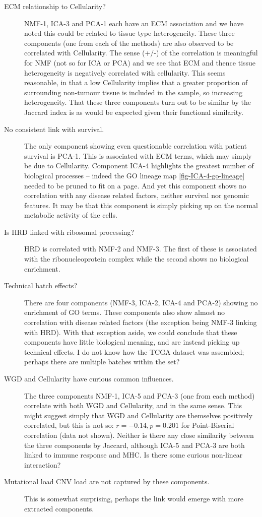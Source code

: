 \documentclass[tikz, 11pt,a4paper,oneside,fleqn, draft]{article}
\begin{document}
\begin{description}
\item[ECM relationship to Cellularity?]
NMF-1, ICA-3 and PCA-1 each have an ECM association and we have noted this could be related to tissue type heterogeneity.   These three components (one from each of the methods) are also observed to be correlated with Cellularity.  The sense (+/-) of the correlation is meaningful for NMF (not so for ICA or PCA) and we see that ECM and thence tissue heterogeneity is negatively correlated with cellularity. This seems reasonable, in that a low Cellularity implies that a greater proportion of surrounding non-tumour tissue is included in the sample, so increasing heterogeneity.   That these three components turn out to be similar by the Jaccard index is as would be expected given their functional similarity.
\item[No consistent link with survival.]
The only component showing even questionable correlation with patient survival is  PCA-1.  This is associated with ECM terms, which may simply be due to Cellularity.  
Component ICA-4 highlights the greatest number of biological processes -- indeed the GO lineage map \ref{fig-ICA-4-go-lineage} needed to be pruned to fit on a page.  And yet this component shows no correlation with any disease related factors, neither survival nor genomic features.  It may be that this component is simply picking up on the normal metabolic activity of the cells.
\item[Is HRD linked with ribosomal processing?]  HRD is correlated with NMF-2 and NMF-3.  The first of these is associated with the ribonucleoprotein complex while the second shows no biological enrichment.
\item[Technical batch effects?]
There are four components (NMF-3, ICA-2, ICA-4 and PCA-2) showing no enrichment of GO terms.  These components also show almost no correlation with disease related factors (the exception being NMF-3 linking with HRD).  With that exception aside, we could conclude that these components have little biological meaning, and are instead picking up technical effects.  I do not know how the TCGA dataset was assembled; perhaps there are multiple batches within the set?
\item[WGD and Cellularity have curious common influences.]
The three components NMF-1, ICA-5 and PCA-3 (one from each method) correlate with both WGD and Cellularity, and in the same sense. 
This might suggest simply that WGD and Cellularity are themselves positively correlated, but this is not so: $r=-0.14, p=0.201$ for Point-Biserial correlation (data not shown).  Neither is there any close similarity between the three components by Jaccard, although ICA-5 and PCA-3 are both linked to immune response and MHC.   Is there some curious non-linear interaction?
\item[Mutational load CNV load are not captured by these components.]  This is somewhat surprising, perhaps the link would emerge with more extracted components.
\end{description} 
\end{document}
